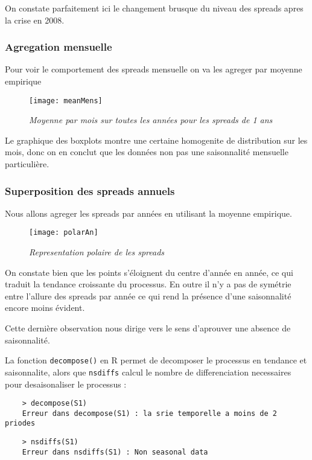     On constate parfaitement ici le changement brusque du niveau des spreads
    apres la crise en 2008.
    \subsubsection{Agregation mensuelle}
    Pour voir le comportement des spreads mensuelle on va les agreger par
    moyenne empirique  

    \begin{figure}[H]
        \centering 
        \label{fig:meanMens} 
        \texttt{[image: meanMens]} 
        \caption{\it Moyenne par mois sur toutes les années pour les spreads
        de 1 ans } 
    \end{figure} 

    Le graphique des boxplots montre une certaine homogenite de distribution sur
     les mois, donc on en conclut que les données non pas une saisonnalité
     mensuelle particulière.
    \subsubsection{Superposition des spreads annuels} 
    Nous allons agreger les spreads par années en utilisant la moyenne
    empirique.
    \begin{figure}[H]
        \centering 
        \label{fig:polarAn} 
        \texttt{[image: polarAn]} 
        \caption{\it Representation polaire de les spreads } 
    \end{figure} 


    On constate bien que les points s'éloignent du centre d'année en
    année, ce qui traduit la tendance croissante du processus. En outre
    il n'y a pas de symétrie entre l'allure des spreads par année ce qui
    rend la présence d'une saisonnalité encore moins évident.

    Cette dernière observation nous dirige vers le sens d'aprouver une
    absence de saisonnalité.  

    La fonction \verb+decompose()+  en R permet de decomposer le processus en
    tendance et saisonnalite, alors que \verb+nsdiffs+ calcul le nombre de
    differenciation necessaires pour desaisonaliser le processus :
    \begin{verbatim}
    > decompose(S1)
    Erreur dans decompose(S1) : la srie temporelle a moins de 2 priodes
    \end{verbatim}

    \begin{verbatim}
    > nsdiffs(S1)
    Erreur dans nsdiffs(S1) : Non seasonal data
    \end{verbatim}


